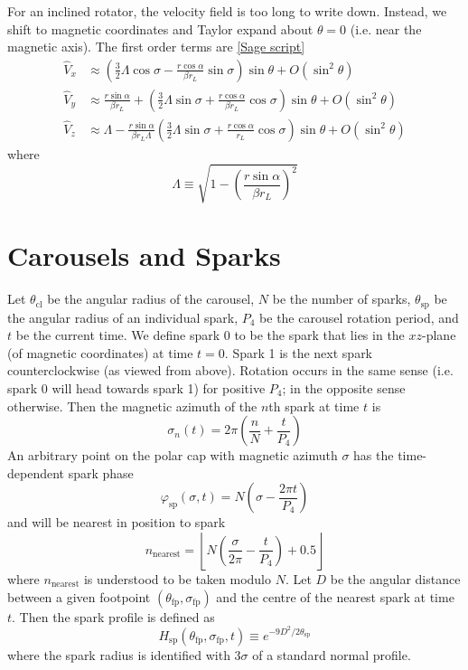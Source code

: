 \documentclass{book}
\newcommand{\phase}{\varphi}
\newcommand{\linktosage}[1]{\hyperref[#1]{[Sage script]}}
\begin{document}
For an inclined rotator, the velocity field is too long to write down.
Instead, we shift to magnetic coordinates and Taylor expand about $\theta = 0$ (i.e. near the magnetic axis).
The first order terms are \linktosage{sage:V_taylor}
\begin{align}
    \hat{V}_x &\approx \left(\frac32\Lambda\cos\sigma -
                    \frac{r\cos\alpha}{\beta r_L}\sin\sigma \right) \sin\theta + O(\sin^2\theta) \\
    \hat{V}_y &\approx \frac{r\sin\alpha}{\beta r_L} +
               \left(\frac32\Lambda\sin\sigma +
                    \frac{r\cos\alpha}{\beta r_L}\cos\sigma \right) \sin\theta + O(\sin^2\theta) \\
    \hat{V}_z &\approx \Lambda - \frac{r\sin\alpha}{\beta r_L\Lambda}\left(\frac32\Lambda\sin\sigma +
                    \frac{r\cos\alpha}{r_L}\cos\sigma \right) \sin\theta + O(\sin^2\theta)
\end{align}
where
\begin{equation}
    \Lambda \equiv \sqrt{1-\left(\frac{r\sin\alpha}{\beta r_L}\right)^2}
\end{equation}

\section{Carousels and Sparks}
\label{sec:carousel}

Let $\theta_\text{cl}$ be the angular radius of the carousel, $N$ be the number of sparks, $\theta_\text{sp}$ be the angular radius of an individual spark, $P_4$ be the carousel rotation period, and $t$ be the current time.
We define spark $0$ to be the spark that lies in the $xz$-plane (of magnetic coordinates) at time $t=0$.
Spark 1 is the next spark counterclockwise (as viewed from above).
Rotation occurs in the same sense (i.e. spark 0 will head towards spark 1) for positive $P_4$; in the opposite sense otherwise.
Then the magnetic azimuth of the $n$th spark at time $t$ is
\begin{equation}
    \sigma_n(t) = 2\pi\left(\frac{n}{N} + \frac{t}{P_4}\right)
\end{equation}
An arbitrary point on the polar cap with magnetic azimuth $\sigma$ has the time-dependent spark phase
\begin{equation}
    \phase_\text{sp}(\sigma,t) = N\left(\sigma - \frac{2\pi t}{P_4}\right)
\end{equation}
and will be nearest in position to spark
\begin{equation}
    n_\text{nearest} = \left\lfloor N\left(\frac{\sigma}{2\pi} - \frac{t}{P_4}\right) + 0.5 \right\rfloor
\end{equation}
where $n_\text{nearest}$ is understood to be taken modulo $N$.
Let $D$ be the angular distance between a given footpoint $(\theta_\text{fp},\sigma_\text{fp})$ and the centre of the nearest spark at time $t$.
Then the spark profile is defined as
\begin{equation}
    H_\text{sp}(\theta_\text{fp},\sigma_\text{fp},t) \equiv e^{-9D^2/2\theta_\text{sp}}
\end{equation}
where the spark radius is identified with $3\sigma$ of a standard normal profile.
\end{document}
